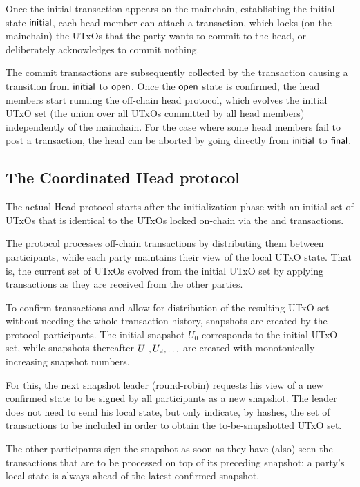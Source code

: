 

Once the initial transaction appears on the mainchain, establishing the initial
state $\mathsf{initial}$, each head member can attach a \mtxCom{} transaction, which
locks (on the mainchain) the UTxOs that the party wants to commit to the head,
or deliberately acknowledges to commit nothing.

The commit transactions are subsequently collected by the \mtxCCom{} transaction
causing a transition from $\mathsf{initial}$ to $\mathsf{open}$. Once the $\mathsf{open}$ state is
confirmed, the head members start running the off-chain head protocol, which
evolves the initial UTxO set (the union over all UTxOs committed by all head
members) independently of the mainchain. For the case where some head members
fail to post a \mtxCom{} transaction, the head can be aborted by going directly
from $\mathsf{initial}$ to $\mathsf{final}$.


\subsection{The Coordinated Head protocol}

The actual Head protocol starts after the initialization phase with an initial
set of UTxOs that is identical to the UTxOs locked on-chain via the \mtxCom{}
and \mtxCCom{} transactions.

The protocol processes off-chain transactions by distributing them between participants,
while each party maintains their view of the local UTxO state. That is, the current
set of UTxOs evolved from the initial UTxO set by applying transactions as they
are received from the other parties.

To confirm transactions and allow for distribution of the resulting UTxO set
without needing the whole transaction history, snapshots are created by the
protocol participants. The initial snapshot $U_{0}$ corresponds to the initial
UTxO set, while snapshots thereafter $U_1,U_2,\ldots$ are created with
monotonically increasing snapshot numbers.

For this, the next snapshot leader (round-robin) requests his view of a new confirmed state to be
signed by all participants as a new snapshot. The leader does not need to send his local state,
but only indicate, by hashes, the set of transactions to be included in order to
obtain the to-be-snapshotted UTxO set.

The other participants sign the snapshot as soon as they have (also) seen the
transactions that are to be processed on top of its preceding snapshot: a
party's local state is always ahead of the latest confirmed snapshot.

